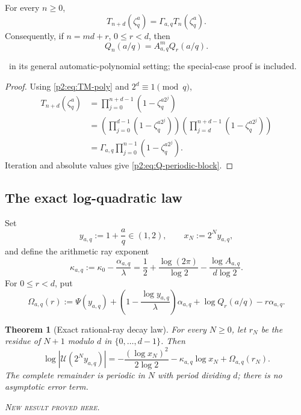 \documentclass[11pt,oneside]{article}
\newtheorem{theorem}{Theorem}[section]
\theoremstyle{definition}
\theoremstyle{remark}
\newcommand{\newresult}{\textcolor{newgreen}{\textsc{New result proved here.}}}
\begin{document}
\begin{proposition}\label{p2:prop:root-recurrence}
For every $n\ge0$,
\begin{equation}
 T_{n+d}(\zeta_q^a)=\Gamma_{a,q}T_n(\zeta_q^a).
 \label{p2:eq:root-recurrence}
\end{equation}
Consequently, if $n=md+r$, $0\le r<d$, then
\begin{equation}
 Q_n(a/q)=A_{a,q}^mQ_r(a/q).
 \label{p2:eq:Q-periodic-block}
\end{equation}

\smallskip\noindent\importedPartx\ in its general automatic-polynomial setting; the
special-case proof is included.
\end{proposition}

\begin{proof}
Using \eqref{p2:eq:TM-poly} and $2^d\equiv1\pmod q$,
\begin{align*}
 T_{n+d}(\zeta_q^a)
 &=\prod_{j=0}^{n+d-1}(1-\zeta_q^{a2^j})\\
 &=\left(\prod_{j=0}^{d-1}(1-\zeta_q^{a2^j})\right)
   \left(\prod_{j=d}^{n+d-1}(1-\zeta_q^{a2^j})\right)\\
 &=\Gamma_{a,q}\prod_{j=0}^{n-1}(1-\zeta_q^{a2^j}).
\end{align*}
Iteration and absolute values give \eqref{p2:eq:Q-periodic-block}.
\end{proof}

\subsection{The exact log-quadratic law}

Set
\begin{equation}
 y_{a,q}:=1+\frac aq\in(1,2),\qquad x_N:=2^Ny_{a,q},
 \label{p2:eq:rational-ray}
\end{equation}
and define the arithmetic ray exponent
\begin{equation}
 \boxed{
 \kappa_{a,q}:=\kappa_0-\frac{\alpha_{a,q}}{\lambda}
 =\frac12+\frac{\log(2\pi)}{\log2}
 -\frac{\log A_{a,q}}{d\log2}.}
 \label{p2:eq:kappa-aq}
\end{equation}
For $0\le r<d$, put
\begin{equation}
 \Omega_{a,q}(r):=\Psi(y_{a,q})
 +\left(1-\frac{\log y_{a,q}}{\lambda}\right)\alpha_{a,q}
 +\log Q_r(a/q)-r\alpha_{a,q}.
 \label{p2:eq:Omega-def}
\end{equation}

\begin{theorem}[Exact rational-ray decay law]\label{p2:thm:exact-rational-ray}
For every $N\ge0$, let $r_N$ be the residue of $N+1$ modulo $d$ in
$\{0,\ldots,d-1\}$. Then
\begin{equation}
 \boxed{
 \log|\mathscr U(2^Ny_{a,q})|
 =-\frac{(\log x_N)^2}{2\log2}
 -\kappa_{a,q}\log x_N+\Omega_{a,q}(r_N).}
 \label{p2:eq:exact-ray-law}
\end{equation}
The complete remainder is periodic in $N$ with period dividing $d$; there is no
asymptotic error term.

\smallskip\noindent\newresult
\end{theorem}
\end{document}
